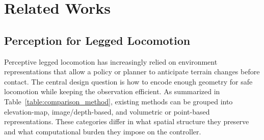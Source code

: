 \section{Related Works}
\subsection{Perception for Legged Locomotion}
\label{sec:RELATED WORKS}
Perceptive legged locomotion has increasingly relied on environment representations that allow a policy or planner to anticipate terrain changes before contact. The central design question is how to encode enough geometry for safe locomotion while keeping the observation efficient.
As summarized in Table~\ref{table:comparison_method}, existing methods can be grouped into elevation-map, image/depth-based, and volumetric or point-based representations. These categories differ in what spatial structure they preserve and what computational burden they impose on the controller.
